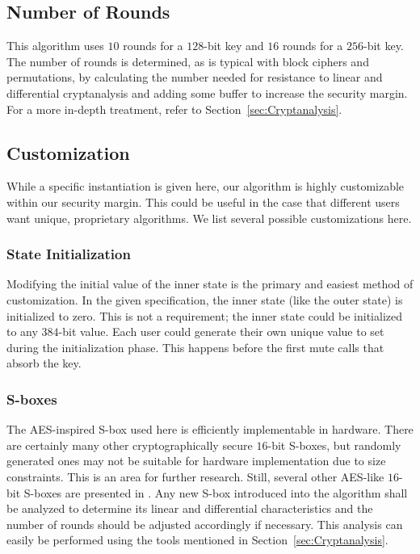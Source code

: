 \subsection{Number of Rounds}
This algorithm uses $10$ rounds for a $128$-bit key and $16$ rounds for a $256$-bit key.
The number of rounds is determined, as is typical with block ciphers and permutations, by calculating the number needed for resistance to linear and differential cryptanalysis and adding some buffer to increase the security margin. 
For a more in-depth treatment, refer to Section~\ref{sec:Cryptanalysis}.

\subsection{Customization}
While a specific instantiation is given here, our algorithm is highly customizable within our security margin.
This could be useful in the case that different users want unique, proprietary algorithms.
We list several possible customizations here.

\subsubsection{State Initialization}
Modifying the initial value of the inner state is the primary and easiest method of customization.
In the given specification, the inner state (like the outer state) is initialized to zero.
This is not a requirement; the inner state could be initialized to any $384$-bit value.
Each user could generate their own unique value to set during the initialization phase.
This happens before the first mute calls that absorb the key.

\subsubsection{S-boxes}
The AES-inspired S-box used here is efficiently implementable in hardware.
There are certainly many other cryptographically secure $16$-bit S-boxes, but randomly generated ones may not be suitable for hardware implementation due to size constraints.
This is an area for further research.
Still, several other AES-like $16$-bit S-boxes are presented in \cite{Wood2013_SboxThesis}.
Any new S-box introduced into the algorithm shall be analyzed to determine its linear and differential characteristics and the number of rounds should be adjusted accordingly if necessary.
This analysis can easily be performed using the tools mentioned in Section~\ref{sec:Cryptanalysis}.


